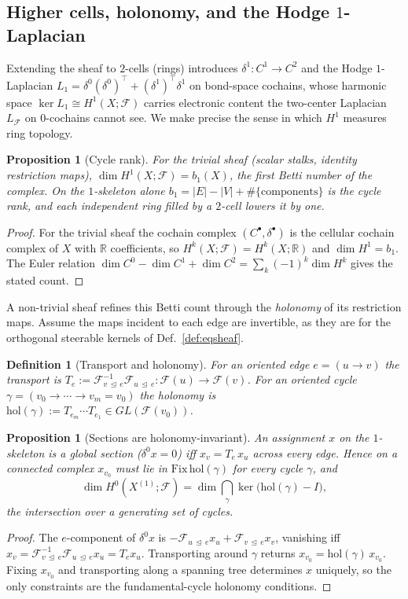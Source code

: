 \documentclass[pdflatex,sn-mathphys-num]{sn-jnl}%
\newcommand{\R}{\mathbb{R}}
\newcommand{\F}{\mathcal{F}}
\newcommand{\X}{X}
\newcommand{\incid}{\trianglelefteq}
\newcommand{\restr}[2]{\F_{#1\,\incid\,#2}}
\theoremstyle{thmstyleone}
\newtheorem{proposition}[theorem]{Proposition}
\theoremstyle{thmstyletwo}
\theoremstyle{thmstylethree}
\newtheorem{definition}[theorem]{Definition}
\begin{document}
\subsection{Higher cells, holonomy, and the Hodge $1$-Laplacian}\label{subsec:h1}
Extending the sheaf to $2$-cells (rings) introduces $\delta^1:C^1\to C^2$ and the
Hodge $1$-Laplacian $L_1=\delta^0(\delta^0)^\top+(\delta^1)^\top\delta^1$ on
bond-space cochains, whose harmonic space $\ker L_1\cong H^1(\X;\F)$ carries
electronic content the two-center Laplacian $L_\F$ on $0$-cochains cannot see. We
make precise the sense in which $H^1$ measures ring topology.

\begin{proposition}[Cycle rank]\label{prop:betti}
For the trivial sheaf (scalar stalks, identity restriction maps),
$\dim H^1(\X;\F)=b_1(\X)$, the first Betti number of the complex. On the
$1$-skeleton alone $b_1=|E|-|V|+\#\{\text{components}\}$ is the cycle rank, and
each independent ring filled by a $2$-cell lowers it by one.
\end{proposition}
\begin{proof}
For the trivial sheaf the cochain complex $(C^\bullet,\delta^\bullet)$ is the
cellular cochain complex of $\X$ with $\R$ coefficients, so
$H^k(\X;\F)=H^k(\X;\R)$ and $\dim H^1=b_1$. The Euler relation
$\dim C^0-\dim C^1+\dim C^2=\sum_k(-1)^k\dim H^k$ gives the stated count.
\end{proof}

A non-trivial sheaf refines this Betti count through the \emph{holonomy} of its
restriction maps. Assume the maps incident to each edge are invertible, as they
are for the orthogonal steerable kernels of Def.~\ref{def:eqsheaf}.

\begin{definition}[Transport and holonomy]\label{def:holonomy}
For an oriented edge $e=(u\!\to\!v)$ the \emph{transport} is
$T_e:=\restr{v}{e}^{-1}\restr{u}{e}:\F(u)\to\F(v)$. For an oriented cycle
$\gamma=(v_0\!\to\!\cdots\!\to\!v_m=v_0)$ the \emph{holonomy} is
$\mathrm{hol}(\gamma):=T_{e_m}\cdots T_{e_1}\in GL(\F(v_0))$.
\end{definition}

\begin{proposition}[Sections are holonomy-invariant]\label{prop:holonomy}
An assignment $x$ on the $1$-skeleton is a global section ($\delta^0x=0$) iff
$x_v=T_e\,x_u$ across every edge. Hence on a connected complex $x_{v_0}$ must lie
in $\mathrm{Fix}\,\mathrm{hol}(\gamma)$ for every cycle $\gamma$, and
\[
\dim H^0(\X^{(1)};\F)=\dim\bigcap_{\gamma}\ker\!\big(\mathrm{hol}(\gamma)-I\big),
\]
the intersection over a generating set of cycles.
\end{proposition}
\begin{proof}
The $e$-component of $\delta^0x$ is $-\restr{u}{e}x_u+\restr{v}{e}x_v$, vanishing
iff $x_v=\restr{v}{e}^{-1}\restr{u}{e}x_u=T_ex_u$. Transporting around $\gamma$
returns $x_{v_0}=\mathrm{hol}(\gamma)\,x_{v_0}$. Fixing $x_{v_0}$ and transporting
along a spanning tree determines $x$ uniquely, so the only constraints are the
fundamental-cycle holonomy conditions.
\end{proof}
\end{document}
